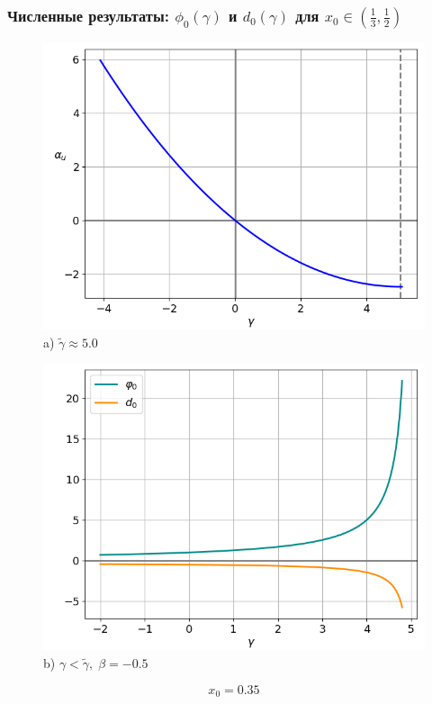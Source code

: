 \documentclass[fullscreen=true, unicode, bookmarks=false]{beamer}
\begin{document}
\begin{frame}
\frametitle{ Численные результаты: $ \phi_0(\gamma) $ и $ d_0(\gamma) $ для $ x_0 \in \left( \frac{1}{3}, \frac{1}{2} \right) $ }

\begin{figure} 
\begin{minipage}[h]{0.49\linewidth}
\begin{center}
\includegraphics[scale=0.38]{x0=0,35.png} \\ {\scriptsize a) $ \widetilde{\gamma} \approx 5.0 $}
\end{center}
\end{minipage} 
\hfill
\begin{minipage}[h]{0.49\linewidth}
\begin{center}
\includegraphics[scale=0.38]{divergent_phi0d0_x0=0,35,beta=-0,5_before.png}  \\ {\scriptsize b) $ \gamma <  \widetilde{\gamma}, \; \beta = -0.5 $}
\end{center}
\end{minipage} 
\end{figure}

$$ x_0 = 0.35 $$

\end{frame}
\end{document}
